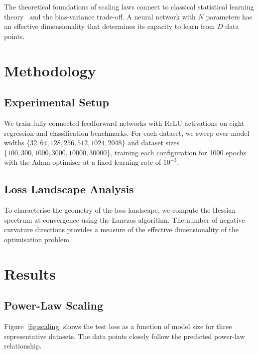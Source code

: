 \documentclass[
    language=english,
    doctype=article,
    institution=none,
    titlestyle=book,
]{../../omnilatex}
\begin{document}
The theoretical foundations of scaling laws connect to classical statistical
learning theory~\cite{goossensLaTeXCompanion1993} and the bias-variance
trade-off.  A neural network with $N$ parameters has an effective
dimensionality that determines its capacity to learn from $D$ data points.

\section{Methodology}

\subsection{Experimental Setup}
We train fully connected feedforward networks with ReLU activations on eight
regression and classification benchmarks.  For each dataset, we sweep over
model widths $\{32, 64, 128, 256, 512, 1024, 2048\}$ and dataset sizes
$\{100, 300, 1000, 3000, 10000, 30000\}$, training each configuration for
1000 epochs with the Adam optimiser at a fixed learning rate of $10^{-3}$.

\subsection{Loss Landscape Analysis}
To characterise the geometry of the loss landscape, we compute the Hessian
spectrum at convergence using the Lanczos algorithm.  The number of negative
curvature directions provides a measure of the effective dimensionality of the
optimisation problem.

\section{Results}

\subsection{Power-Law Scaling}
Figure~\ref{fig:scaling} shows the test loss as a function of model size for
three representative datasets.  The data points closely follow the predicted
power-law relationship.
\end{document}
